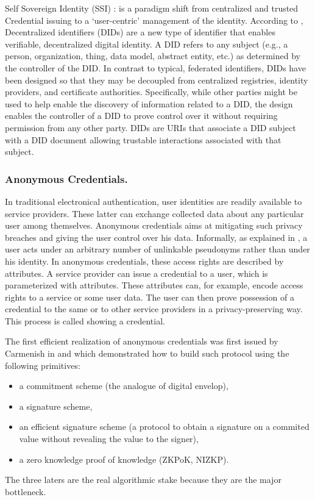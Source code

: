 \documentclass[11pt]{llncs2e/llncs}
\begin{document}
Self Sovereign Identity (SSI) : is a paradigm shift from centralized and trusted Credential issuing to a  ‘user-centric’ management of the identity. According to \cite{W3CDId21}, Decentralized identifiers (DIDs) are a new type of identifier that enables verifiable, decentralized digital identity. A DID refers to any subject (e.g., a person, organization, thing, data model, abstract entity, etc.) as determined by the controller of the DID. In contrast to typical, federated identifiers, DIDs have been designed so that they may be decoupled from centralized registries, identity providers, and certificate authorities. Specifically, while other parties might be used to help enable the discovery of information related to a DID, the design enables the controller of a DID to prove control over it without requiring permission from any other party. DIDs are URIs that associate a DID subject with a DID document allowing trustable interactions associated with that subject.

\subsubsection{Anonymous Credentials.}


In traditional electronical authentication,  user identities are readily available to service providers. These latter can exchange collected data about any particular user among themselves. Anonymous credentials aims at mitigating such privacy breaches and giving the
user  control over his data. Informally, as explained in \cite{DBLP:conf/crypto/BaumBCPGL18}, a user acts
under an arbitrary number of unlinkable pseudonyms rather than under his identity.
In anonymous credentials, these access rights are described by attributes. A service provider can issue a credential to a user, which is parameterized with attributes. These attributes can, for example,
encode access rights to a service or some user data. The user can then prove possession
of a credential to the same or to other service providers in a privacy-preserving way.
This process is called showing a credential.


The first efficient realization of anonymous credentials was first issued by Carmenish in \cite{CL02} and \cite{CL04} which demonstrated how to build such protocol using the following primitives:
\begin{itemize}
 \item a commitment scheme (the analogue of digital envelop),
 \item a signature scheme,
 \item an efficient signature scheme (a protocol to obtain a signature on a commited value without revealing the value to the signer),
 \item a zero knowledge proof of knowledge (ZKPoK, NIZKP).
\end{itemize}
The three laters are the real algorithmic stake because they are the major bottleneck.
\end{document}
